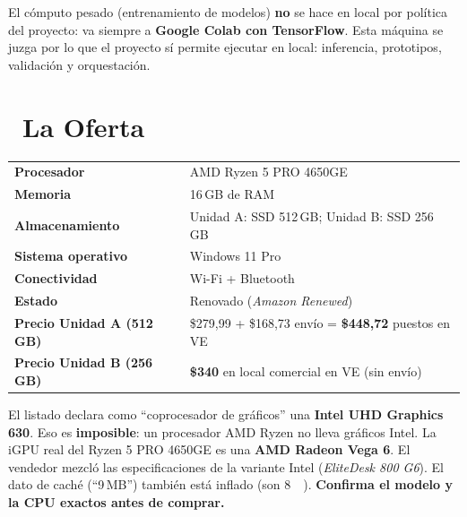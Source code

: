 \documentclass[11pt,a4paper]{article}
\newcommand{\iconotexto}[2]{\textcolor{cyanNeon}{\faIcon{#1}}~#2}
\begin{document}
\begin{cajaRecuerda}
El cómputo pesado (entrenamiento de modelos) \textbf{no} se hace en local por política
del proyecto: va siempre a \textbf{Google Colab con TensorFlow}. Esta máquina se juzga
por lo que el proyecto sí permite ejecutar en local: inferencia, prototipos, validación
y orquestación.
\end{cajaRecuerda}

\section[La Oferta]{\iconotexto{tag}{La Oferta}}

\begin{tcolorbox}[tarjetaDato, title={\faIcon{coins}~HP EliteDesk 805 G6 Mini PC (dos unidades renovadas)}]
\begin{tabular}{ll}
\toprule
\textbf{Procesador} & AMD Ryzen 5 PRO 4650GE \\
\textbf{Memoria} & 16\,GB de RAM \\
\textbf{Almacenamiento} & Unidad A: SSD 512\,GB; Unidad B: SSD 256\,GB \\
\textbf{Sistema operativo} & Windows 11 Pro \\
\textbf{Conectividad} & Wi-Fi + Bluetooth \\
\textbf{Estado} & Renovado (\textit{Amazon Renewed}) \\
\textbf{Precio Unidad A (512\,GB)} & \$279{,}99 + \$168{,}73 envío = \textbf{\$448{,}72} puestos en VE \\
\textbf{Precio Unidad B (256\,GB)} & \textbf{\$340} en local comercial en VE (sin envío) \\
\bottomrule
\end{tabular}
\end{tcolorbox}

\begin{tcolorbox}[cajaMejora, title={\faIcon{exclamation-triangle}~La ficha del anuncio contiene un dato falso}]
El listado declara como ``coprocesador de gráficos'' una
\textbf{Intel UHD Graphics 630}. Eso es \textbf{imposible}: un procesador AMD Ryzen no
lleva gráficos Intel. La iGPU real del Ryzen 5 PRO 4650GE es una
\textbf{AMD Radeon Vega 6}. El vendedor mezcló las especificaciones de la variante
Intel (\emph{EliteDesk 800 G6}). El dato de caché (``9\,MB'') también está inflado
(son \SI{8}{\mega\byte}). \textbf{Confirma el modelo y la CPU exactos antes de comprar.}
\end{tcolorbox}
\end{document}
